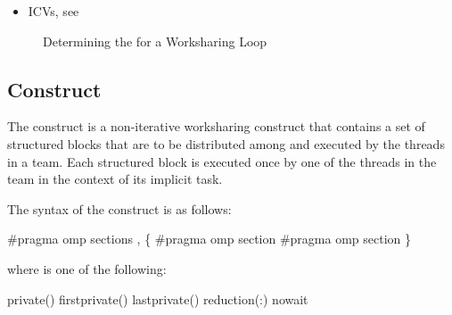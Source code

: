 \begin{itemize}
\item ICVs, see 
\end{itemize}


\begin{figure}[h]
\begin{quote} %

\end{quote}
\caption{Determining the  for a Worksharing Loop\label{fig:schedule loop}}
\end{figure}











\subsection{ Construct}
\label{subsec:sections Construct}
\summary
The  construct is a non-iterative worksharing construct that contains a set of 
structured blocks that are to be distributed among and executed by the threads in a team. 
Each structured block is executed once by one of the threads in the team in the context 
of its implicit task.

\pagebreak
\syntax
\ccppspecificstart
The syntax of the  construct is as follows:

\begin{boxedcode}
\#pragma omp sections \plc{[clause[ [},\plc{] clause] ... ] new-line}
   \{
   \plc{[}\#pragma omp section \plc{]}
   \plc{[}\#pragma omp section 
      \plc{structured-block]}
   \}
\end{boxedcode}

where  is one of the following: 

\begin{indentedcodelist}
private()
firstprivate()
lastprivate()
reduction(:)
nowait
\end{indentedcodelist}
\ccppspecificend

